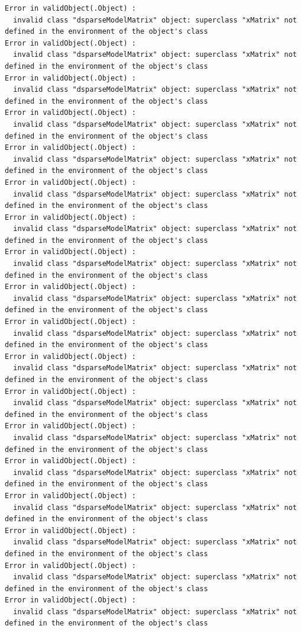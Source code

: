 \documentclass[
  man,
  floatsintext,
  longtable,
  nolmodern,
  notxfonts,
  notimes,
  colorlinks=true,linkcolor=blue,citecolor=blue,urlcolor=blue]{apa7}
\begin{document}
\begin{verbatim}
Error in validObject(.Object) : 
  invalid class "dsparseModelMatrix" object: superclass "xMatrix" not defined in the environment of the object's class
Error in validObject(.Object) : 
  invalid class "dsparseModelMatrix" object: superclass "xMatrix" not defined in the environment of the object's class
Error in validObject(.Object) : 
  invalid class "dsparseModelMatrix" object: superclass "xMatrix" not defined in the environment of the object's class
Error in validObject(.Object) : 
  invalid class "dsparseModelMatrix" object: superclass "xMatrix" not defined in the environment of the object's class
Error in validObject(.Object) : 
  invalid class "dsparseModelMatrix" object: superclass "xMatrix" not defined in the environment of the object's class
Error in validObject(.Object) : 
  invalid class "dsparseModelMatrix" object: superclass "xMatrix" not defined in the environment of the object's class
Error in validObject(.Object) : 
  invalid class "dsparseModelMatrix" object: superclass "xMatrix" not defined in the environment of the object's class
Error in validObject(.Object) : 
  invalid class "dsparseModelMatrix" object: superclass "xMatrix" not defined in the environment of the object's class
Error in validObject(.Object) : 
  invalid class "dsparseModelMatrix" object: superclass "xMatrix" not defined in the environment of the object's class
Error in validObject(.Object) : 
  invalid class "dsparseModelMatrix" object: superclass "xMatrix" not defined in the environment of the object's class
Error in validObject(.Object) : 
  invalid class "dsparseModelMatrix" object: superclass "xMatrix" not defined in the environment of the object's class
Error in validObject(.Object) : 
  invalid class "dsparseModelMatrix" object: superclass "xMatrix" not defined in the environment of the object's class
Error in validObject(.Object) : 
  invalid class "dsparseModelMatrix" object: superclass "xMatrix" not defined in the environment of the object's class
Error in validObject(.Object) : 
  invalid class "dsparseModelMatrix" object: superclass "xMatrix" not defined in the environment of the object's class
Error in validObject(.Object) : 
  invalid class "dsparseModelMatrix" object: superclass "xMatrix" not defined in the environment of the object's class
Error in validObject(.Object) : 
  invalid class "dsparseModelMatrix" object: superclass "xMatrix" not defined in the environment of the object's class
Error in validObject(.Object) : 
  invalid class "dsparseModelMatrix" object: superclass "xMatrix" not defined in the environment of the object's class
Error in validObject(.Object) : 
  invalid class "dsparseModelMatrix" object: superclass "xMatrix" not defined in the environment of the object's class
\end{verbatim}
\end{document}
